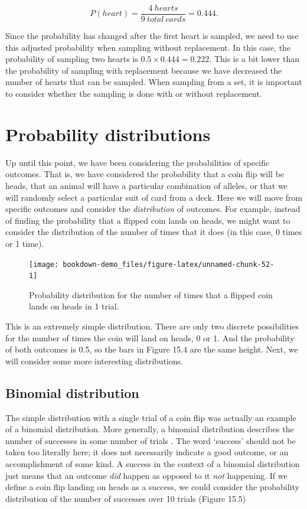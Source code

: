 \documentclass[
  openany]{scrbook}
\begin{document}
\[P(heart) = \frac{4\:hearts}{9\:total\:cards} = 0.444.\]

Since the probability has changed after the first heart is sampled, we need to use this adjusted probability when sampling without replacement.
In this case, the probability of sampling two hearts is \(0.5 \times 0.444 = 0.222\).
This is a bit lower than the probability of sampling with replacement because we have decreased the number of hearts that can be sampled.
When sampling from a set, it is important to consider whether the sampling is done with or without replacement.

\hypertarget{probability-distributions}{%
\section{Probability distributions}\label{probability-distributions}}

Up until this point, we have been considering the probabilities of specific outcomes.
That is, we have considered the probability that a coin flip will be heads, that an animal will have a particular combination of alleles, or that we will randomly select a particular suit of card from a deck.
Here we will move from specific outcomes and consider the \emph{distribution} of outcomes.
For example, instead of finding the probability that a flipped coin lands on heads, we might want to consider the distribution of the number of times that it does (in this case, 0 times or 1 time).

\begin{figure}
\texttt{[image: bookdown-demo\_files/figure-latex/unnamed-chunk-52-1]} \caption{Probability distribution for the number of times that a flipped coin lands on heads in 1 trial.}\label{fig:unnamed-chunk-52}
\end{figure}

This is an extremely simple distribution.
There are only two discrete possibilities for the number of times the coin will land on heads, 0 or 1.
And the probability of both outcomes is 0.5, so the bars in Figure 15.4 are the same height.
Next, we will consider some more interesting distributions.

\hypertarget{binomial-distribution}{%
\subsection{Binomial distribution}\label{binomial-distribution}}

The simple distribution with a single trial of a coin flip was actually an example of a binomial distribution.
More generally, a binomial distribution describes the number of successes in some number of trials \citep{Miller2004}.
The word `success' should not be taken too literally here; it does not necessarily indicate a good outcome, or an accomplishment of some kind.
A success in the context of a binomial distribution just means that an outcome \emph{did} happen as opposed to it \emph{not} happening.
If we define a coin flip landing on heads as a success, we could consider the probability distribution of the number of successes over 10 trials (Figure 15.5)
\end{document}
